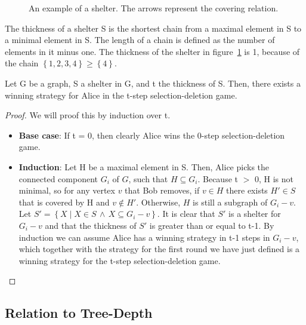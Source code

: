 \begin{figure}[H]

\caption{An example of a shelter. The arrows represent the covering relation. \label{fig:shelter-example}}
\end{figure}
The thickness of a shelter S is the shortest chain from a maximal element in S to a minimal element in S. The length of a chain is defined as the number of elements in it minus one. The thickness of the shelter in figure~\ref{fig:shelter-example} is 1, because of the chain $\left\{ 1, 2, 3, 4\right\} \geq \left\{4\right\}$.
\begin{lemma}
Let G be a graph, S a shelter in G, and t the thickness of S. Then, there exists a winning strategy for Alice in the t-step selection-deletion game.
\label{lemma:Alice-win}
\end{lemma}
\begin{proof}
We will proof this by induction over t.
\begin{itemize}
  \item \textbf{Base case}: If t = 0, then clearly Alice wins the 0-step selection-deletion game.
  \item \textbf{Induction}: Let H be a maximal element in S. Then, Alice picks the connected component $G_i$ of $G$, such that $H \subseteq G_i$. Because t $>$ 0, H is not minimal, so for any vertex $v$ that Bob removes, if $v \in H$ there exists $H' \in S$ that is covered by H and $v \notin H'$. Otherwise, $H$ is still a subgraph of $G_i - v$. Let $S' =\left\{X \mid X \in S \, \wedge \, X \subseteq G_i - v\right\}$. It is clear that $S'$ is a shelter for $G_i - v$ and that the thickness of $S'$ is greater than or equal to t-1. By induction we can assume Alice has a winning strategy in t-1 steps in $G_i - v$, which together with the strategy for the first round we have just defined is a winning strategy for the t-step selection-deletion game.
\end{itemize}
\end{proof}


\subsection{Relation to Tree-Depth}

